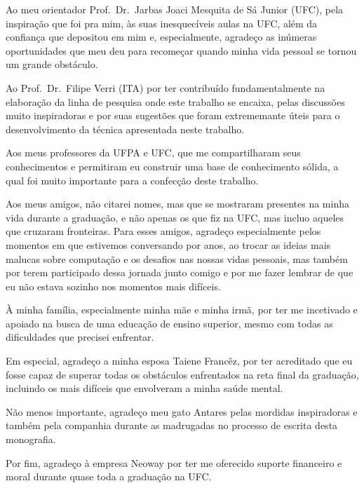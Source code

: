 Ao meu orientador Prof.\ Dr.\ Jarbas Joaci Mesquita de Sá Junior
(UFC), pela inspiração que foi pra mim, às suas inesquecíveis aulas na
UFC, além da confiança que depositou em mim e, especialmente, agradeço
as inúmeras oportunidades que meu deu para recomeçar quando minha vida
pessoal se tornou um grande obstáculo.

Ao Prof.\ Dr.\ Filipe Verri (ITA) por ter contribuído fundamentalmente
na elaboração da linha de pesquisa onde este trabalho se encaixa,
pelas discussões muito inspiradoras e por suas sugestões que foram
extrememante úteis para o desenvolvimento da técnica apresentada neste
trabalho.

Aos meus professores da UFPA e UFC, que me compartilharam seus
conhecimentos e permitiram eu construir uma base de conhecimento
sólida, a qual foi muito importante para a confecção deste trabalho.

Aos meus amigos, não citarei nomes, mas que se mostraram presentes na
minha vida durante a graduação, e não apenas os que fiz na UFC, mas
incluo aqueles que cruzaram fronteiras. Para esses amigos, agradeço
especialmente pelos momentos em que estivemos conversando por anos, ao
trocar as ideias mais malucas sobre computação e os desafios nas
nossas vidas pessoais, mas também por terem participado dessa jornada
junto comigo e por me fazer lembrar de que eu não estava sozinho nos
momentos mais difíceis.

À minha família, especialmente minha mãe e minha irmã, por ter me
incetivado e apoiado na busca de uma educação de ensino superior, mesmo
com todas as dificuldades que precisei enfrentar.

Em especial, agradeço a minha esposa Taiene Francêz, por ter
acreditado que eu fosse capaz de superar todas os obstáculos
enfrentados na reta final da graduação, incluindo os mais difíceis que
envolveram a minha saúde mental.

Não menos importante, agradeço meu gato Antares pelas mordidas
inspiradoras e também pela companhia durante as madrugadas no processo
de escrita desta monografia.

Por fim, agradeço à empresa Neoway por ter me oferecido suporte financeiro e moral
durante quase toda a graduação na UFC.\@
